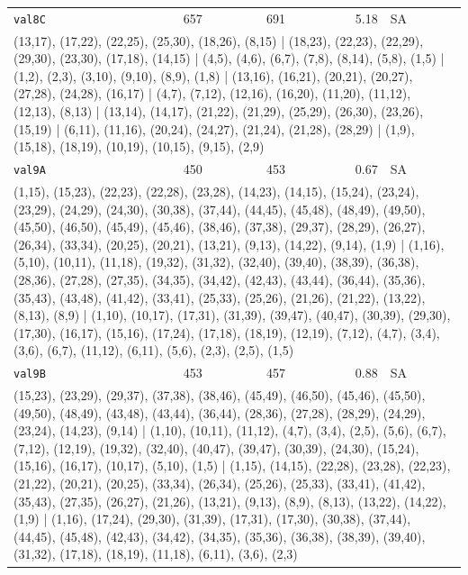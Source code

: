 \begin{longtable}{lrrrl}
\texttt{val8C} & 657 & 691 & 5.18 & SA \\
\multicolumn{5}{p{0.96\linewidth}}{\tiny\raggedright\arraybackslash (13,17), (17,22), (22,25), (25,30), (18,26), (8,15) | (18,23), (22,23), (22,29), (29,30), (23,30), (17,18), (14,15) | (4,5), (4,6), (6,7), (7,8), (8,14), (5,8), (1,5) | (1,2), (2,3), (3,10), (9,10), (8,9), (1,8) | (13,16), (16,21), (20,21), (20,27), (27,28), (24,28), (16,17) | (4,7), (7,12), (12,16), (16,20), (11,20), (11,12), (12,13), (8,13) | (13,14), (14,17), (21,22), (21,29), (25,29), (26,30), (23,26), (15,19) | (6,11), (11,16), (20,24), (24,27), (21,24), (21,28), (28,29) | (1,9), (15,18), (18,19), (10,19), (10,15), (9,15), (2,9)} \\[2pt]
\texttt{val9A} & 450 & 453 & 0.67 & SA \\
\multicolumn{5}{p{0.96\linewidth}}{\tiny\raggedright\arraybackslash (1,15), (15,23), (22,23), (22,28), (23,28), (14,23), (14,15), (15,24), (23,24), (23,29), (24,29), (24,30), (30,38), (37,44), (44,45), (45,48), (48,49), (49,50), (45,50), (46,50), (45,49), (45,46), (38,46), (37,38), (29,37), (28,29), (26,27), (26,34), (33,34), (20,25), (20,21), (13,21), (9,13), (14,22), (9,14), (1,9) | (1,16), (5,10), (10,11), (11,18), (19,32), (31,32), (32,40), (39,40), (38,39), (36,38), (28,36), (27,28), (27,35), (34,35), (34,42), (42,43), (43,44), (36,44), (35,36), (35,43), (43,48), (41,42), (33,41), (25,33), (25,26), (21,26), (21,22), (13,22), (8,13), (8,9) | (1,10), (10,17), (17,31), (31,39), (39,47), (40,47), (30,39), (29,30), (17,30), (16,17), (15,16), (17,24), (17,18), (18,19), (12,19), (7,12), (4,7), (3,4), (3,6), (6,7), (11,12), (6,11), (5,6), (2,3), (2,5), (1,5)} \\[2pt]
\texttt{val9B} & 453 & 457 & 0.88 & SA \\
\multicolumn{5}{p{0.96\linewidth}}{\tiny\raggedright\arraybackslash (15,23), (23,29), (29,37), (37,38), (38,46), (45,49), (46,50), (45,46), (45,50), (49,50), (48,49), (43,48), (43,44), (36,44), (28,36), (27,28), (28,29), (24,29), (23,24), (14,23), (9,14) | (1,10), (10,11), (11,12), (4,7), (3,4), (2,5), (5,6), (6,7), (7,12), (12,19), (19,32), (32,40), (40,47), (39,47), (30,39), (24,30), (15,24), (15,16), (16,17), (10,17), (5,10), (1,5) | (1,15), (14,15), (22,28), (23,28), (22,23), (21,22), (20,21), (20,25), (33,34), (26,34), (25,26), (25,33), (33,41), (41,42), (35,43), (27,35), (26,27), (21,26), (13,21), (9,13), (8,9), (8,13), (13,22), (14,22), (1,9) | (1,16), (17,24), (29,30), (31,39), (17,31), (17,30), (30,38), (37,44), (44,45), (45,48), (42,43), (34,42), (34,35), (35,36), (36,38), (38,39), (39,40), (31,32), (17,18), (18,19), (11,18), (6,11), (3,6), (2,3)} \\[2pt]

\end{longtable}
